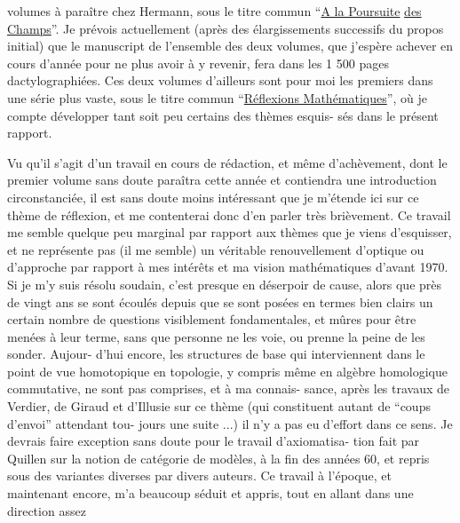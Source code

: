 
volumes à paraître chez Hermann, sous le titre commun ``\uline{A la Poursuite}
\uline{des Champs}''. Je prévois actuellement (après des élargissements
successifs du propos initial) que le manuscript de l'ensemble des
deux volumes, que j'espère achever en cours d'année pour ne plus
avoir à y revenir, fera dans les 1 500 pages dactylographiées.
Ces deux volumes d'ailleurs sont pour moi les premiers dans une
série plus vaste, sous le titre commun ``\uline{Réflexions Mathématiques}'',
où je compte développer tant soit peu certains des thèmes esquis-%
sés dans le présent rapport.

Vu qu'il s'agit d'un travail en cours de rédaction,
et même d'achèvement, dont le premier volume sans doute paraîtra
cette année et contiendra une introduction circonstanciée, il
est sans doute moins intéressant que je m'étende ici sur ce thème
de réflexion, et me contenterai donc d'en parler très brièvement.
Ce travail me semble quelque peu marginal par rapport aux thèmes
que je viens d'esquisser, et ne représente pas (il me semble) un
véritable renouvellement d'optique ou d'approche par rapport à
mes intérêts et ma vision mathématiques d'avant 1970. Si je m'y
suis résolu soudain, c'est presque en déserpoir de cause, alors
que près de vingt ans se sont écoulés depuis que se sont posées
en termes bien clairs un certain nombre de questions visiblement
fondamentales, et mûres pour être menées à leur terme, sans que
personne ne les voie, ou prenne la peine de les sonder. Aujour-%
d'hui encore, les structures de base qui interviennent dans le
point de vue homotopique en topologie, y compris même en algèbre
homologique commutative, ne sont pas comprises, et à ma connais-%
sance, après les travaux de Verdier, de Giraud et d'Illusie sur
ce thème (qui constituent autant de ``coups d'envoi'' attendant tou-%
jours une suite ...) il n'y a pas eu d'effort dans ce sens. Je
devrais faire exception sans doute pour le travail d'axiomatisa-%
tion fait par Quillen sur la notion de catégorie de modèles, à
la fin des années 60, et repris sous des variantes diverses par
divers auteurs. Ce travail à l'époque, et maintenant encore, m'a
beaucoup séduit et appris, tout en allant dans une direction assez

